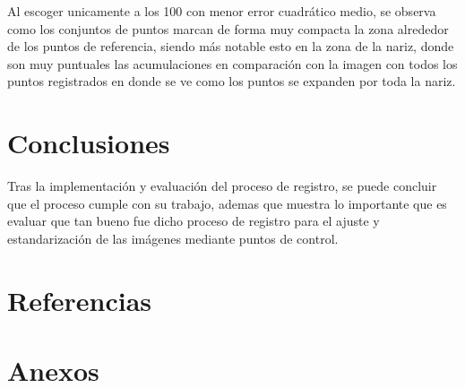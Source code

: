 \documentclass[11pt, letterpaper]{article}
\begin{document}
Al escoger unicamente a los 100 con menor error cuadrático medio, se observa como los conjuntos de puntos marcan de forma muy compacta la zona alrededor de los puntos de referencia, siendo más notable esto en la zona de la nariz, donde son muy puntuales las acumulaciones en comparación con la imagen con todos los puntos registrados en donde se ve como los puntos se expanden por toda la nariz.

\newpage
	
\section{Conclusiones}

Tras la implementación y evaluación del proceso de registro, se puede concluir que el proceso cumple con su trabajo, ademas que muestra lo importante que es evaluar que tan bueno fue dicho proceso de registro para el ajuste y estandarización de las imágenes mediante puntos de control.	
	

\newpage

	
\section{Referencias}  %

\newpage
	
\section{Anexos}	
\end{document}

